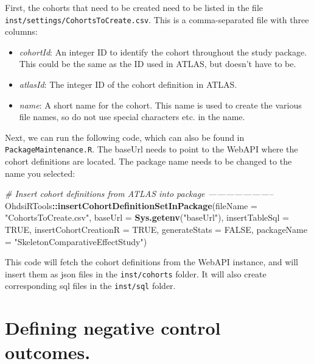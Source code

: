 \documentclass[]{article}
\newenvironment{Shaded}{\begin{snugshade}}{\end{snugshade}}
\newcommand{\CommentTok}[1]{\textcolor[rgb]{0.56,0.35,0.01}{\textit{#1}}}
\newcommand{\DataTypeTok}[1]{\textcolor[rgb]{0.13,0.29,0.53}{#1}}
\newcommand{\KeywordTok}[1]{\textcolor[rgb]{0.13,0.29,0.53}{\textbf{#1}}}
\newcommand{\NormalTok}[1]{#1}
\newcommand{\OperatorTok}[1]{\textcolor[rgb]{0.81,0.36,0.00}{\textbf{#1}}}
\newcommand{\OtherTok}[1]{\textcolor[rgb]{0.56,0.35,0.01}{#1}}
\newcommand{\StringTok}[1]{\textcolor[rgb]{0.31,0.60,0.02}{#1}}
\providecommand{\tightlist}{%
  \setlength{\itemsep}{0pt}\setlength{\parskip}{0pt}}
\begin{document}
First, the cohorts that need to be created need to be listed in the file
\texttt{inst/settings/CohortsToCreate.csv}. This is a comma-separated
file with three columns:

\begin{itemize}
\tightlist
\item
  \emph{cohortId}: An integer ID to identify the cohort throughout the
  study package. This could be the same as the ID used in ATLAS, but
  doesn't have to be.
\item
  \emph{atlasId}: The integer ID of the cohort definition in ATLAS.
\item
  \emph{name}: A short name for the cohort. This name is used to create
  the various file names, so do not use special characters etc. in the
  name.
\end{itemize}

Next, we can run the following code, which can also be found in
\texttt{PackageMaintenance.R}. The baseUrl needs to point to the WebAPI
where the cohort definitions are located. The package name needs to be
changed to the name you selected:

\begin{Shaded}
\begin{Highlighting}[]
\CommentTok{# Insert cohort definitions from ATLAS into package -----------------------}
\NormalTok{OhdsiRTools}\OperatorTok{::}\KeywordTok{insertCohortDefinitionSetInPackage}\NormalTok{(}\DataTypeTok{fileName =} \StringTok{"CohortsToCreate.csv"}\NormalTok{,}
                                                \DataTypeTok{baseUrl =} \KeywordTok{Sys.getenv}\NormalTok{(}\StringTok{"baseUrl"}\NormalTok{),}
                                                \DataTypeTok{insertTableSql =} \OtherTok{TRUE}\NormalTok{,}
                                                \DataTypeTok{insertCohortCreationR =} \OtherTok{TRUE}\NormalTok{,}
                                                \DataTypeTok{generateStats =} \OtherTok{FALSE}\NormalTok{,}
                                                \DataTypeTok{packageName =} \StringTok{"SkeletonComparativeEffectStudy"}\NormalTok{)}
\end{Highlighting}
\end{Shaded}

This code will fetch the cohort definitions from the WebAPI instance,
and will insert them as json files in the \texttt{inst/cohorts} folder.
It will also create corresponding sql files in the \texttt{inst/sql}
folder.

\hypertarget{defining-negative-control-outcomes.}{%
\section{Defining negative control
outcomes.}\label{defining-negative-control-outcomes.}}
\end{document}
